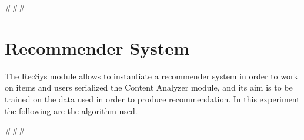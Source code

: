
\usepackage{comment}

###
\section{Recommender System}\label{sec:recsys}
The RecSys module allows to instantiate a recommender system in order to work on items and users serialized
the Content Analyzer module, and its aim is to be trained on the data used in order to produce recommendation.
In this experiment the following are the algorithm used.

###


\begin{comment}
Author = DIEGO MICCOLI
Alias = Kozen88
Organization = SWAP Research Group UniBa
Date = 27-12-2023

This mini template is not working by itself because there are latex command missing needed
to compile the file and give as output a pdf file, in addition it has been added jinja
statement in order to control the rendering of the latex file with the jinja library, for these
reasons it needs to be used with the other mini chunks in conjunction.
\end{comment}
